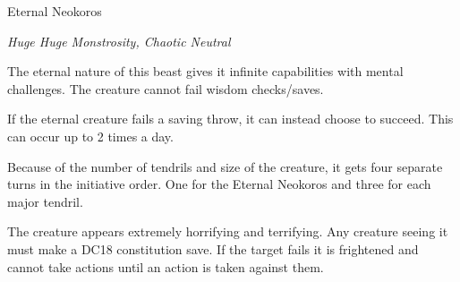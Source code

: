 \begin{monsterbox}{Eternal Neokoros}
	\begin{hangingpar}
		\textit{Huge Huge Monstrosity, Chaotic Neutral}
	\end{hangingpar}
	\dndline%
	\basics[%
	armorclass = 22 (Body) + 25 (tendrils),
	hitpoints  = 460,
	speed      = 5 ft (self) + 50 ft (tendrils)
	]
	\dndline%
	\stats[
	STR = \stat{21}, %
	DEX = \stat{18},
	CON = \stat{30},
	INT = \stat{30},
	WIS = \stat{24},
	CHA = \stat{16}
	]
	\dndline%
	\begin{monsteraction}
		The eternal nature of this beast gives it infinite capabilities with mental challenges. The creature cannot fail wisdom checks/saves.
	\end{monsteraction}	
	\begin{monsteraction}
		If the eternal creature fails a saving throw, it can instead choose to succeed. This can occur up to 2 times a day.
	\end{monsteraction}
	\begin{monsteraction}
		Because of the number of tendrils and size of the creature, it gets four separate turns in the initiative order. One for the Eternal Neokoros and three for each major tendril. 
	\end{monsteraction}	
	\begin{monsteraction}
		The creature appears extremely horrifying and terrifying. Any creature seeing it must make a DC18 constitution save. If the target fails it is frightened and cannot take actions until an action is taken against them. 
	\end{monsteraction}	
	

\end{monsterbox}
